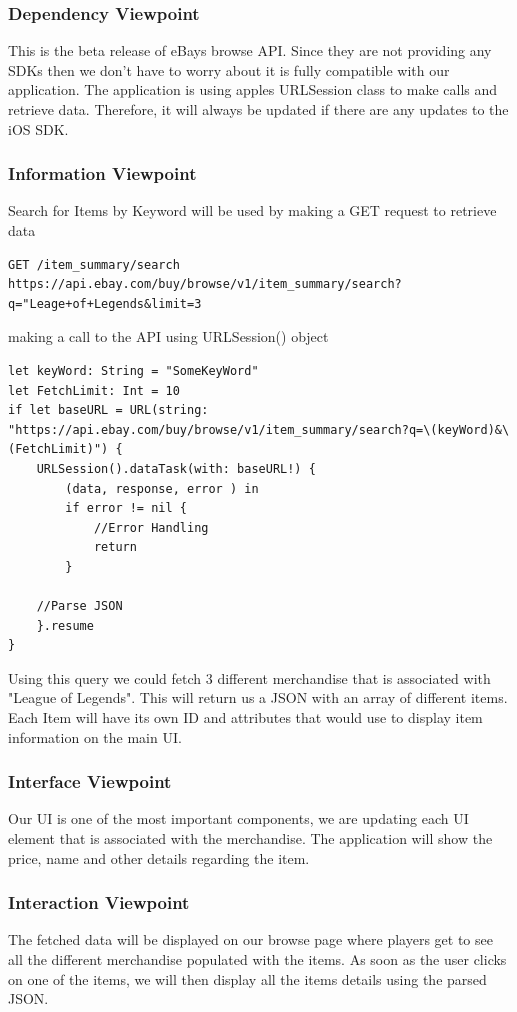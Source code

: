 \documentclass[onecolumn, draftclsnofoot,10pt, compsoc]{IEEEtran}
\begin{document}
\subsubsection{Dependency Viewpoint}
This is the beta release of eBays browse API. Since they are not providing any SDKs then we don't have to worry about it is fully compatible with our application. The application is using apples URLSession class to make calls and retrieve data. Therefore, it will always be updated if there are any updates to the iOS SDK. 

\subsubsection{Information Viewpoint}
Search for Items by Keyword will be used by making a GET request to retrieve data

\begin{verbatim}
GET /item_summary/search
https://api.ebay.com/buy/browse/v1/item_summary/search?q="Leage+of+Legends&limit=3
\end{verbatim}
making a call to the API using URLSession() object
\begin{verbatim}
let keyWord: String = "SomeKeyWord"
let FetchLimit: Int = 10
if let baseURL = URL(string: "https://api.ebay.com/buy/browse/v1/item_summary/search?q=\(keyWord)&\(FetchLimit)") {
    URLSession().dataTask(with: baseURL!) {
        (data, response, error ) in
        if error != nil {
            //Error Handling
            return
        }
        
    //Parse JSON
    }.resume
}
\end{verbatim}

\noindent Using this query we could fetch 3 different merchandise that is associated with "League of Legends". This will return us a JSON with an array of different items. Each Item will have its own ID and attributes that would use to display item information on the main UI.
\subsubsection{Interface Viewpoint}
Our UI is one of the most important components, we are updating each UI element that is associated with the merchandise. The application will show the price, name and other details regarding the item.
\subsubsection{Interaction Viewpoint}
The fetched data will be displayed on our browse page where players get to see all the different merchandise populated with the items. As soon as the user clicks on one of the items, we will then display all the items details using the parsed JSON. 
\end{document}
